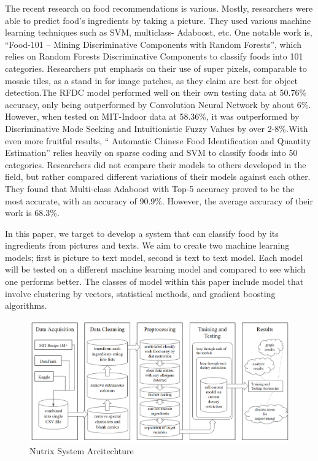 \documentclass[twocolumn]{article}
\begin{document}
The recent research on food recommendations is various. Mostly, researchers were able to predict food’s ingredients by taking a picture. They used various machine learning techniques such as SVM, multiclass- Adaboost, etc. One notable work is, “Food-101 – Mining Discriminative Components with Random Forests”, which relies on Random Forests Discriminative Components to classify foods into 101 categories. Researchers put emphasis on their use of super pixels, comparable to mosaic tiles, as a stand in for image patches, as they claim are best for object detection.The RFDC model performed well on their own testing data at 50.76\% accuracy, only being outperformed by Convolution Neural Network by about 6\%. However, when tested on MIT-Indoor data at 58.36\%, it was outperformed by Discriminative Mode Seeking and Intuitionistic Fuzzy Values by over 2-8\%.With even more fruitful results, “  Automatic Chinese Food Identification and Quantity Estimation” relies heavily on sparse coding and SVM to classify foods into 50 categories. Researchers did not compare their models to others developed in the field, but rather compared different variations of their models against each other. They found that Multi-class Adaboost with Top-5 accuracy proved to be the most accurate, with an accuracy of 90.9\%. However, the average accuracy of their work is 68.3\%.

In this paper, we target to develop a system that can classify food by its ingredients from pictures and texts. We aim to create two machine learning models; first is picture to text model, second is text to text model. Each model will be tested on a different machine learning model and compared to see which one performs better. The classes of model within this paper include model that involve clustering by vectors, statistical methods, and gradient boosting algorithms. 


\begin{figure}[h]
	\centering
	\includegraphics[width=0.7\linewidth]{"System Architecture"}
	\caption{Nutrix System Arcitechture}
	\label{fig:system-architecture}
\end{figure}
\end{document}
